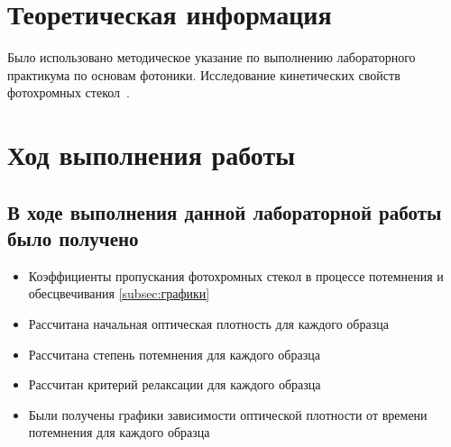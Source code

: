 
\section{Теоретическая информация}\label{sec:теоретическая-информация}
Было использовано методическое указание по выполнению лабораторного практикума по основам фотоники.
Исследование кинетических свойств фотохромных стекол~\cite{conlan1983massive}.

\section{Ход выполнения работы}\label{sec:ход-выполнения-работы}

\subsection{В ходе выполнения данной лабораторной работы было получено}\label{subsec:в-ходе-выполнения-данной-лабораторной-работы-было-получено}

\begin{itemize}
	\item Коэффициенты пропускания фотохромных стекол в процессе потемнения и обесцвечивания \ref{subsec:графики}
	\item Рассчитана начальная оптическая плотность для каждого образца
	\item Рассчитана степень потемнения для каждого образца
	\item Рассчитан критерий релаксации для каждого образца
	\item Были получены графики зависимости оптической плотности от времени потемнения для каждого образца
\end{itemize}


